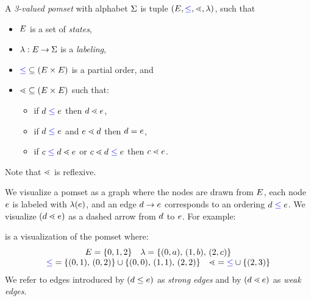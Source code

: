\begin{definition}
  A \emph{3-valued pomset} with alphabet $\Sigma$ is tuple $(E,
  {\mathrel{{\color{blue}\leq}}}, {\lessdot}, \lambda)$, such that 
  \begin{itemize}
  \item $E$ is a set of \emph{states},
  \item $\lambda: E \mathbin\rightarrow \Sigma$ is a \emph{labeling},
  \item ${\mathrel{{\color{blue}\leq}}} \subseteq (E\times E)$ is a partial order, and
  \item ${\lessdot} \subseteq (E\times E)$ such that:
    \begin{itemize}
    \item\label{5a} if $d \mathrel{{\color{blue}\leq}} e$ then $d \lessdot e$,
    \item\label{5b} if $d \mathrel{{\color{blue}\leq}} e$ and $e \lessdot d$ then $d = e$,
    \item if $c \mathrel{{\color{blue}\leq}} d \lessdot e$ or $c \lessdot d \mathrel{{\color{blue}\leq}} e$ then $c \lessdot e$.
    \end{itemize}
\end{itemize}
\end{definition}
Note that $\lessdot$ is reflexive.


We visualize a pomset as a graph where the nodes are drawn from $E$,
each node $e$ is labeled with $\lambda(e)$, and an edge
$d \rightarrow e$ corresponds to an ordering $d\mathrel{{\color{blue}\leq}}e$.  We
visualize $(d \lessdot e)$ as a dashed arrow from $d$ to $e$.  For
example:
\begin{tikzdisplay}[node distance=1em]
\end{tikzdisplay}
is a visualization of the pomset where:
\[\begin{array}{c}
    E = \{ 0,1,2 \}
    \quad
    {\lambda} = \{(0,a),\,(1,b),\,(2,c)\}
    \\
    {\mathrel{{\color{blue}\leq}}} = \{(0,1),\,(0,2)\}\cup\{(0,0),\,(1,1),\,(2,2)\}
    \quad
    {\lessdot} = {\mathrel{{\color{blue}\leq}}}\cup\{(2,3)\}
\end{array}\]
We refer to edges introduced by $(d \leq e)$ as
\emph{strong edges} and by $(d \lessdot e)$
as \emph{weak edges}.


